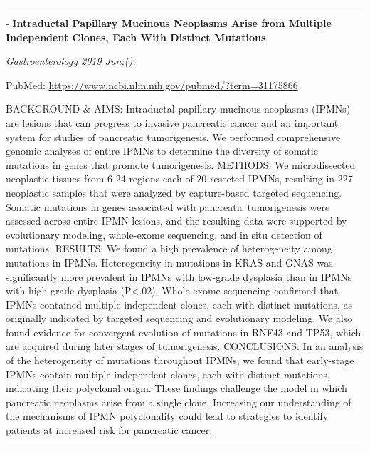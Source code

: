 \documentclass[]{article}
\begin{document}
{}

{}

\begin{center}\rule{0.5\linewidth}{\linethickness}\end{center}

 - \textbf{Intraductal Papillary Mucinous Neoplasms Arise from Multiple
Independent Clones, Each With Distinct Mutations}

\emph{Gastroenterology 2019 Jun;():}

PubMed: \url{https://www.ncbi.nlm.nih.gov/pubmed/?term=31175866}

BACKGROUND \& AIMS: Intraductal papillary mucinous neoplasms (IPMNs) are
lesions that can progress to invasive pancreatic cancer and an important
system for studies of pancreatic tumorigenesis. We performed
comprehensive genomic analyses of entire IPMNs to determine the
diversity of somatic mutations in genes that promote tumorigenesis.
METHODS: We microdissected neoplastic tissues from 6-24 regions each of
20 resected IPMNs, resulting in 227 neoplastic samples that were
analyzed by capture-based targeted sequencing. Somatic mutations in
genes associated with pancreatic tumorigenesis were assessed across
entire IPMN lesions, and the resulting data were supported by
evolutionary modeling, whole-exome sequencing, and in situ detection of
mutations. RESULTS: We found a high prevalence of heterogeneity among
mutations in IPMNs. Heterogeneity in mutations in KRAS and GNAS was
significantly more prevalent in IPMNs with low-grade dysplasia than in
IPMNs with high-grade dysplasia (P\textless{}.02). Whole-exome
sequencing confirmed that IPMNs contained multiple independent clones,
each with distinct mutations, as originally indicated by targeted
sequencing and evolutionary modeling. We also found evidence for
convergent evolution of mutations in RNF43 and TP53, which are acquired
during later stages of tumorigenesis. CONCLUSIONS: In an analysis of the
heterogeneity of mutations throughout IPMNs, we found that early-stage
IPMNs contain multiple independent clones, each with distinct mutations,
indicating their polyclonal origin. These findings challenge the model
in which pancreatic neoplasms arise from a single clone. Increasing our
understanding of the mechanisms of IPMN polyclonality could lead to
strategies to identify patients at increased risk for pancreatic cancer.

{}

{}

\begin{center}\rule{0.5\linewidth}{\linethickness}\end{center}
\end{document}
